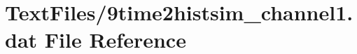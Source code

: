 \hypertarget{9time2histsim__channel1_8dat}{}\section{Text\+Files/9time2histsim\+\_\+channel1.dat File Reference}
\label{9time2histsim__channel1_8dat}
